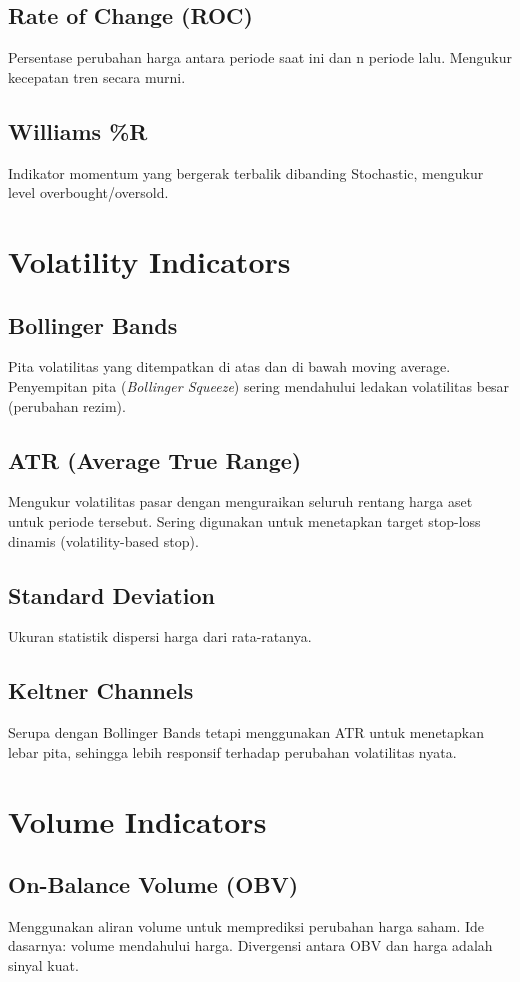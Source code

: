 \documentclass[12pt,a4paper]{book}
\begin{document}
\subsection{Rate of Change (ROC)}
Persentase perubahan harga antara periode saat ini dan n periode lalu. Mengukur kecepatan tren secara murni.

\subsection{Williams \%R}
Indikator momentum yang bergerak terbalik dibanding Stochastic, mengukur level overbought/oversold.

\section{Volatility Indicators}
\subsection{Bollinger Bands}
Pita volatilitas yang ditempatkan di atas dan di bawah moving average. Penyempitan pita (\textit{Bollinger Squeeze}) sering mendahului ledakan volatilitas besar (perubahan rezim).

\subsection{ATR (Average True Range)}
Mengukur volatilitas pasar dengan menguraikan seluruh rentang harga aset untuk periode tersebut. Sering digunakan untuk menetapkan target stop-loss dinamis (volatility-based stop).

\subsection{Standard Deviation}
Ukuran statistik dispersi harga dari rata-ratanya.

\subsection{Keltner Channels}
Serupa dengan Bollinger Bands tetapi menggunakan ATR untuk menetapkan lebar pita, sehingga lebih responsif terhadap perubahan volatilitas nyata.

\section{Volume Indicators}
\subsection{On-Balance Volume (OBV)}
Menggunakan aliran volume untuk memprediksi perubahan harga saham. Ide dasarnya: volume mendahului harga. Divergensi antara OBV dan harga adalah sinyal kuat.
\end{document}
